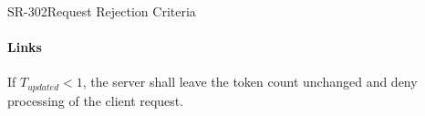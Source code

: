 \begin{softwarerequirement}{SR-302}{Request Rejection Criteria}
\paragraph{Links} 

If $T_{updated} < 1$,
the server shall leave the token count unchanged
and deny processing of the client request.
\end{softwarerequirement}